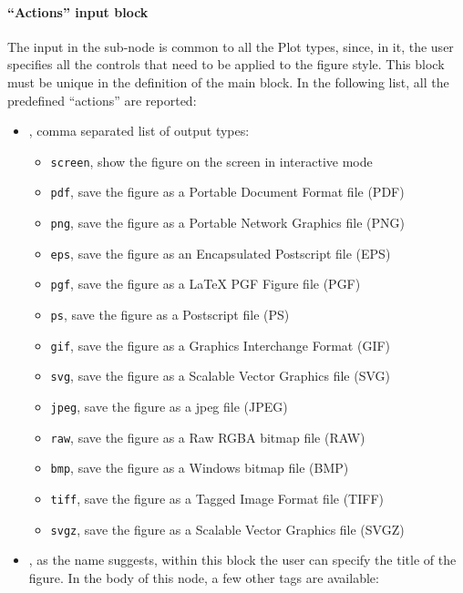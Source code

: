 \paragraph{``Actions'' input block \label{sec:actionsBlock}}
The input in the  sub-node is common to all the Plot types,
since, in it, the user specifies all the controls that need to be applied to the
figure style.
%
This block must be unique in the definition of the  main block.
%
In the following list, all the predefined ``actions'' are reported:
\vspace{-5mm}
\begin{itemize}
  \itemsep0em
  \item {}, comma separated list of output types:
     \begin{itemize}
    \item \texttt{screen}, show the figure on the screen in interactive mode
    \item \texttt{pdf}, save the figure as a Portable Document Format file (PDF)
    \item \texttt{png}, save the figure as a Portable Network Graphics file
    (PNG)
    \item \texttt{eps}, save the figure as an Encapsulated Postscript file (EPS)
    \item \texttt{pgf}, save the figure as a LaTeX PGF Figure file (PGF)
    \item \texttt{ps}, save the figure as a Postscript file (PS)
    \item \texttt{gif}, save the figure as a Graphics Interchange Format (GIF)
    \item \texttt{svg}, save the figure as a Scalable Vector Graphics file (SVG)
    \item \texttt{jpeg}, save the figure as a jpeg file (JPEG)
    \item \texttt{raw}, save the figure as a Raw RGBA bitmap file (RAW)
    \item \texttt{bmp}, save the figure as a Windows bitmap file (BMP)
    \item \texttt{tiff}, save the figure as a Tagged Image Format file (TIFF)
    \item \texttt{svgz}, save the figure as a Scalable Vector Graphics file
    (SVGZ)
      \end{itemize}
  \item {}, as the name suggests, within this block the user can
  specify the title of the figure.
  In the body of this node, a few other tags are available:


\end{itemize}
